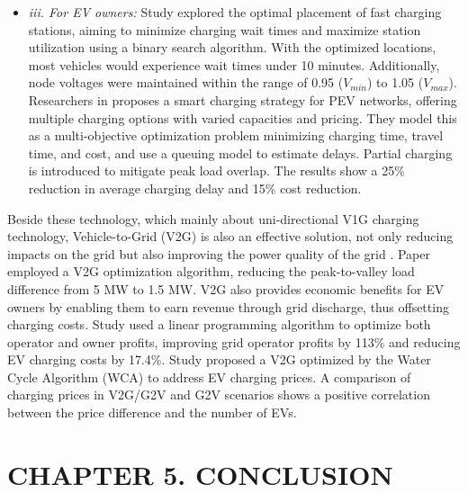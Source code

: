 \documentclass{thesis}
\begin{document}
\begin{itemize}
    \item \textit{iii. For EV owners:} Study \cite{88_greenin} explored the optimal placement of fast charging stations, aiming to minimize charging wait times and maximize station utilization using a binary search algorithm. With the optimized locations, most vehicles would experience wait times under 10 minutes. Additionally, node voltages were maintained within the range of 0.95 ($V_{min}$) to 1.05 ($V_{max}$). Researchers in \cite{moghaddam2017smart} proposes a smart charging strategy for PEV networks, offering multiple charging options with varied capacities and pricing. They model this as a multi-objective optimization problem minimizing charging time, travel time, and cost, and use a queuing model to estimate delays. Partial charging is introduced to mitigate peak load overlap. The results show a 25\% reduction in average charging delay and 15\% cost reduction.
\end{itemize}

Beside these technology, which mainly about uni-directional V1G charging technology, Vehicle-to-Grid (V2G) is also an effective solution, not only reducing impacts on the grid but also improving the power quality of the grid \cite{91_greenin}. Paper \cite{92_greenin} employed a V2G optimization algorithm, reducing the peak-to-valley load difference from 5 MW to 1.5 MW. V2G also provides economic benefits for EV owners by enabling them to earn revenue through grid discharge, thus offsetting charging costs. Study \cite{94_greenin} used a linear programming algorithm to optimize both operator and owner profits, improving grid operator profits by 113\% and reducing EV charging costs by 17.4\%. Study \cite{95_greenin} proposed a V2G optimized by the Water Cycle Algorithm (WCA) to address EV charging prices. A comparison of charging prices in V2G/G2V and G2V scenarios shows a positive correlation between the price difference and the number of EVs.
\clearpage


\section*{CHAPTER 5. CONCLUSION}
   \label{chuong5}
    
\setcounter{section}{5}
    \setcounter{subsection}{0}
        \setcounter{figure}{0}
            \setcounter{table}{0}
\end{document}

